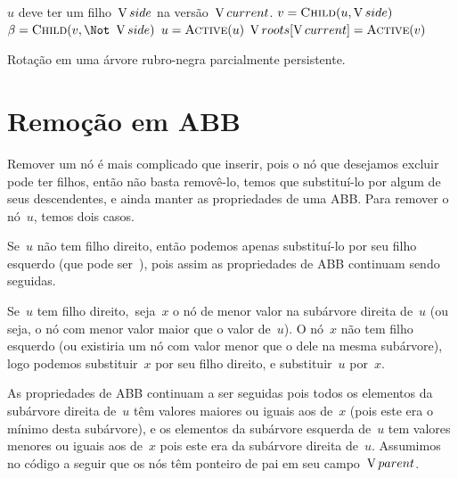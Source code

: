 \documentclass[main.tex]{subfiles}
\begin{document}
\begin{algorithm}
\begin{algorithmic}[1]
\Require $u$ deve ter um filho~$\operatorname{V}{side}$ na versão~$\operatorname{V}{current}$.
	\State $v = \Call{Child}{u, \side}$
	\State $\beta = \Call{Child}{v, \Not\ \side}$
	\State {}
	\State {}
	\State $u = \Call{Active}{u}$ \label{line:rotrb:active}
		\State {}
	\Else
		\State $\roots[\cur] = \Call{Active}{v}$ 
	\EndIf
	\State {}
\EndFunction
\end{algorithmic}
\caption{Rotação em uma árvore rubro-negra parcialmente persistente.} \label{lst:rotrb}
\end{algorithm}

\section{Remoção em ABB}

Remover um nó é mais complicado que inserir, pois o nó que desejamos excluir pode ter filhos, então não basta removê-lo, temos que substituí-lo por algum de seus descendentes, e ainda manter as propriedades de uma ABB. Para remover o nó~$u$, temos dois casos.

Se~$u$ não tem filho direito, então podemos apenas substituí-lo por seu filho esquerdo (que pode ser~), pois assim as propriedades de ABB continuam sendo seguidas.

Se~$u$ tem filho direito,~seja~$x$ o nó de menor valor na subárvore direita de~$u$ (ou seja, o nó com menor valor maior que o valor de~$u$). O nó~$x$ não tem filho esquerdo (ou existiria um nó com valor menor que o dele na mesma subárvore), logo podemos substituir~$x$ por seu filho direito, e substituir~$u$ por~$x$.

As propriedades de ABB continuam a ser seguidas pois todos os elementos da subárvore direita de~$u$ têm valores maiores ou iguais aos de~$x$ (pois este era o mínimo desta subárvore), e os elementos da subárvore esquerda de~$u$ tem valores menores ou iguais aos de~$x$ pois este era da subárvore direita de~$u$. Assumimos no código a seguir que os nós têm ponteiro de pai em seu campo~$\operatorname{V}{parent}$.
\end{document}

